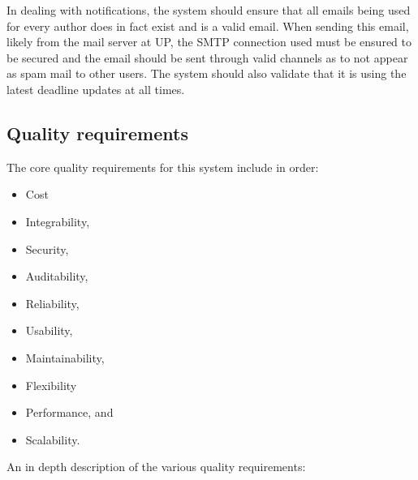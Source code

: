 \documentclass{article}
\begin{document}
		\par In dealing with notifications, the system should ensure that all emails being used for every author does in fact exist and is a valid email. When sending this email, likely from the mail server at UP, the SMTP connection used must be ensured to be secured and the email should be sent through valid channels as to not appear as spam mail to other users. The system should also validate that it is using the latest deadline updates at all times.
		
		
		\cleardoublepage
		
	\subsection{Quality requirements}\label{subsec:quality}
		
		The core quality requirements for this system include in order:
		
		\begin{itemize}
			\item Cost
			\item Integrability,
			\item Security,
			\item Auditability,
			\item Reliability,
			\item Usability,
			\item Maintainability,
			\item Flexibility
			\item Performance, and
			\item Scalability. \newline
		\end{itemize}
		
		An in depth description of the various quality requirements: \newline
		
\end{document}
